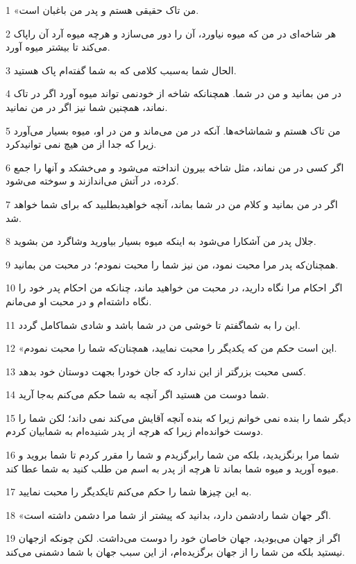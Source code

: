 \par 1 «من تاک حقیقی هستم و پدر من باغبان است.
\par 2 هر شاخه‌ای در من که میوه نیاورد، آن را دور می‌سازد و هر‌چه میوه آرد آن راپاک می‌کند تا بیشتر میوه آورد.
\par 3 الحال شما به‌سبب کلامی که به شما گفته‌ام پاک هستید.
\par 4 در من بمانید و من در شما. همچنانکه شاخه از خودنمی تواند میوه آورد اگر در تاک نماند، همچنین شما نیز اگر در من نمانید.
\par 5 من تاک هستم و شماشاخه‌ها. آنکه در من می‌ماند و من در او، میوه بسیار می‌آورد زیرا که جدا از من هیچ نمی توانیدکرد.
\par 6 اگر کسی در من نماند، مثل شاخه بیرون انداخته می‌شود و می‌خشکد و آنها را جمع کرده، در آتش می‌اندازند و سوخته می‌شود.
\par 7 اگر در من بمانید و کلام من در شما بماند، آنچه خواهیدبطلبید که برای شما خواهد شد.
\par 8 جلال پدر من آشکارا می‌شود به اینکه میوه بسیار بیاورید وشاگرد من بشوید.
\par 9 همچنان‌که پدر مرا محبت نمود، من نیز شما را محبت نمودم؛ در محبت من بمانید.
\par 10 اگر احکام مرا نگاه دارید، در محبت من خواهید ماند، چنانکه من احکام پدر خود را نگاه داشته‌ام و در محبت او می‌مانم.
\par 11 این را به شماگفتم تا خوشی من در شما باشد و شادی شماکامل گردد.
\par 12 «این است حکم من که یکدیگر را محبت نمایید، همچنان‌که شما را محبت نمودم.
\par 13 کسی محبت بزرگتر از این ندارد که جان خودرا بجهت دوستان خود بدهد.
\par 14 شما دوست من هستید اگر آنچه به شما حکم می‌کنم به‌جا آرید.
\par 15 دیگر شما را بنده نمی خوانم زیرا که بنده آنچه آقایش می‌کند نمی داند؛ لکن شما را دوست خوانده‌ام زیرا که هرچه از پدر شنیده‌ام به شمابیان کردم.
\par 16 شما مرا برنگزیدید، بلکه من شما رابرگزیدم و شما را مقرر کردم تا شما بروید و میوه آورید و میوه شما بماند تا هر‌چه از پدر به اسم من طلب کنید به شما عطا کند.
\par 17 به این چیزها شما را حکم می‌کنم تایکدیگر را محبت نمایید.
\par 18 «اگر جهان شما رادشمن دارد، بدانید که پیشتر از شما مرا دشمن داشته است.
\par 19 اگر از جهان می‌بودید، جهان خاصان خود را دوست می‌داشت. لکن چونکه ازجهان نیستید بلکه من شما را از جهان برگزیده‌ام، از این سبب جهان با شما دشمنی می‌کند.
